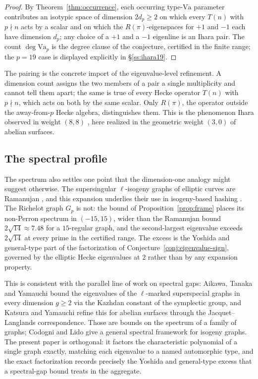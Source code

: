 \documentclass[10pt,a4paper]{amsart}
\newcommand{\Va}{\mathrm{Va}}
\providecommand{\Va}{\mathrm{Va}}
\begin{document}
	\begin{proof}
		By Theorem~\ref{thm:occurrence}, each occurring type-$\Va$ parameter
		contributes an isotypic space of dimension $2d_p\ge2$ on which every
		$T(n)$ with $p\nmid n$ acts by a scalar and on which the
		$R(\pi)$-eigenspaces for $+1$ and $-1$ each have dimension $d_p$; any
		choice of a $+1$ and a $-1$ eigenline is an Ihara pair. The count
		$\deg\Va_p$ is the degree clause of the conjecture, certified in the
		finite range; the $p=19$ case is displayed explicitly in
		\S\ref{ss:ihara19}.
	\end{proof}
	
	The pairing is the concrete import of the eigenvalue-level refinement. A
	dimension count assigns the two members of a pair a single multiplicity
	and cannot tell them apart; the same is true of every Hecke operator
	$T(n)$ with $p\nmid n$, which acts on both by the same scalar. Only
	$R(\pi)$, the operator outside the away-from-$p$ Hecke algebra,
	distinguishes them. This is the phenomenon Ihara observed in weight
	$(8,8)$ \cite{Ihara1967}, here realized in the geometric weight $(3,0)$ of
	abelian surfaces.
	
	\subsection{The spectral profile}
	\label{ss:spectral-profile}
	
	The spectrum also settles one point that the dimension-one analogy might
	suggest otherwise. The supersingular $\ell$-isogeny graphs of elliptic
	curves are Ramanujan \cite{Pizer1990}, and this expansion underlies their
	use in isogeny-based hashing \cite{CGL2009}. The Richelot graph $G_p$ is
	not: the bound of Proposition~\ref{prop:frame} places its non-Perron
	spectrum in $(-15,15)$, wider than the Ramanujan bound $2\sqrt{14}\approx
	7.48$ for a $15$-regular graph, and the second-largest eigenvalue exceeds
	$2\sqrt{14}$ at every prime in the certified range. The excess is the
	Yoshida and general-type part of the factorization of
	Conjecture~\ref{conj:eigenvalue-sign}, governed by the elliptic Hecke
	eigenvalues at $2$ rather than by any expansion property.
	
	This is consistent with the parallel line of work on spectral gaps:
	Aikawa, Tanaka and Yamauchi \cite{AikawaTanakaYamauchi} bound the
	eigenvalues of the $\ell$-marked superspecial graphs in every dimension
	$g\ge2$ via the Kazhdan constant of the symplectic group, and Katsura and
	Yamauchi \cite{KatsuraYamauchi} refine this for abelian surfaces through
	the Jacquet--Langlands correspondence. Those are bounds on the spectrum of
	a family of graphs; Codogni and Lido \cite{CodogniLido} give a general
	spectral framework for isogeny graphs. The present paper is orthogonal: it factors the
	characteristic polynomial of a single graph exactly, matching each
	eigenvalue to a named automorphic type, and the exact factorization
	records precisely the Yoshida and general-type excess that a spectral-gap
	bound treats in the aggregate.
	
\end{document}
